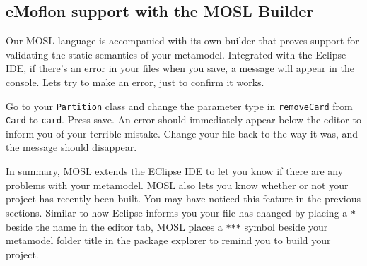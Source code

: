 \newpage
\texHeader

\subsection{ eMoflon support with the MOSL Builder }

\hypertarget{validation tex}{} Our MOSL language is accompanied with its own builder that proves support for validating the static semantics of your metamodel.
Integrated with the Eclipse IDE, if there's an error in your files when you save, a message will appear in the console. Lets try to make an error, just to
confirm it works.

Go to your \texttt{Partition} class and change the parameter type in \texttt{removeCard} from \texttt{Card} to \texttt{card}. Press save. An error should
immediately appear below the editor to inform you of your terrible mistake. Change your file back to the way it was, and the message should disappear.

In summary, MOSL extends the EClipse IDE to let you know if there are any problems with your metamodel. MOSL also lets you know whether or not your project has
recently been built. You may have noticed this feature in the previous sections. Similar to how Eclipse informs you your file has changed by placing a
\texttt{*} beside the name in the editor tab, MOSL places a \texttt{***} symbol beside your metamodel folder title in the package explorer to remind you to
build your project.


